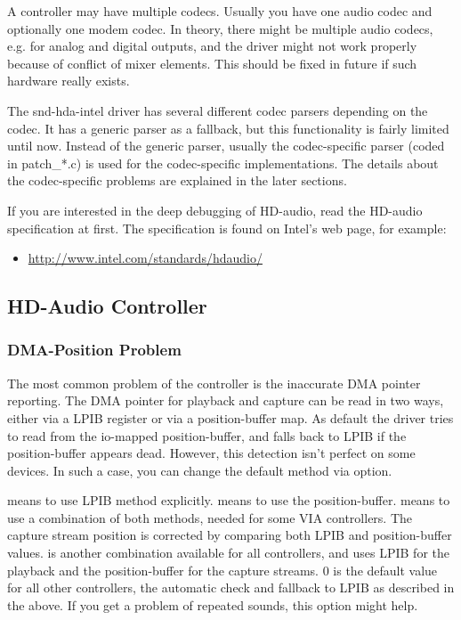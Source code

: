 \documentclass[a4paper,8pt,english]{sphinxmanual}
\begin{document}
A controller may have multiple codecs.  Usually you have one audio
codec and optionally one modem codec.  In theory, there might be
multiple audio codecs, e.g. for analog and digital outputs, and the
driver might not work properly because of conflict of mixer elements.
This should be fixed in future if such hardware really exists.

The snd-hda-intel driver has several different codec parsers depending
on the codec.  It has a generic parser as a fallback, but this
functionality is fairly limited until now.  Instead of the generic
parser, usually the codec-specific parser (coded in patch\_*.c) is used
for the codec-specific implementations.  The details about the
codec-specific problems are explained in the later sections.

If you are interested in the deep debugging of HD-audio, read the
HD-audio specification at first.  The specification is found on
Intel's web page, for example:
\begin{itemize}
\item {} 
\href{http://www.intel.com/standards/hdaudio/}{http://www.intel.com/standards/hdaudio/}

\end{itemize}


\subsection{HD-Audio Controller}
\label{sound/hd-audio/notes:hd-audio-controller}

\subsubsection{DMA-Position Problem}
\label{sound/hd-audio/notes:dma-position-problem}
The most common problem of the controller is the inaccurate DMA
pointer reporting.  The DMA pointer for playback and capture can be
read in two ways, either via a LPIB register or via a position-buffer
map.  As default the driver tries to read from the io-mapped
position-buffer, and falls back to LPIB if the position-buffer appears
dead.  However, this detection isn't perfect on some devices.  In such
a case, you can change the default method via  option.

 means to use LPIB method explicitly.
 means to use the position-buffer.
 means to use a combination of both methods, needed
for some VIA controllers.  The capture stream position is corrected
by comparing both LPIB and position-buffer values.
 is another combination available for all controllers,
and uses LPIB for the playback and the position-buffer for the capture
streams.
0 is the default value for all other
controllers, the automatic check and fallback to LPIB as described in
the above.  If you get a problem of repeated sounds, this option might
help.
\end{document}
